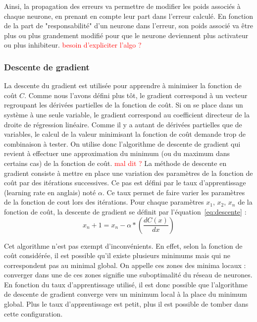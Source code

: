 Ainsi, la propagation des erreurs va permettre de modifier les poids associés à chaque neurone, en prenant en compte leur part dans l'erreur calculé. En fonction de la part de "responsabilité" d'un neurone dans l'erreur, son poids associé va être plus ou plus grandement modifié pour que le neurone deviennent plus activateur ou plus inhibiteur.
\textcolor{red}{besoin d'expliciter l'algo ?}

\subsubsection{Descente de gradient}
La descente du gradient est utilisée pour apprendre à minimiser la fonction de coût $C$. Comme nous l'avons défini plus tôt, le gradient correspond à un vecteur regroupant les dérivées partielles de la fonction de coût. Si on se place dans un système à une seule variable, le gradient correspond au coefficient directeur de la droite de régression linéaire. Comme il y a autant de dérivées partielles que de variables, le calcul de la valeur minimisant la fonction de coût demande trop de combinaison à tester. On utilise donc l'algorithme de descente de gradient qui revient à effectuer une approximation du minimum (ou du maximum dans certains cas) de la fonction de coût. \textcolor{red}{mal dit ?}
La méthode de descente en gradient consiste à mettre en place une variation des paramètres de la fonction de coût par des itérations successives. Ce pas est défini par le taux d'apprentissage (learning rate en anglais) noté $\alpha$. Ce taux permet de faire varier les paramètres de la fonction de cout lors des itérations. Pour chaque paramètres $x_1$, $x_2$, $x_n$ de la fonction de coût, la descente de gradient se définit par l'équation~\ref{eq:descente} :
\begin{equation}
  x_n+1 = x_n - \alpha*(\dfrac{dC(x)}{dx})
\end{equation}

Cet algorithme n'est pas exempt d'inconvénients. En effet, selon la fonction de coût considérée, il est possible qu'il existe plusieurs minimums mais qui ne correspondent pas au minimal global. On appelle ces zones des minima locaux : converger dans une de ces zones signifie une suboptimalité du réseau de neurones. En fonction du taux d'apprentissage utilisé, il est donc possible que l'algorithme de descente de gradient converge vers un minimum local à la place du minimum global. Plus le taux d'apprentissage est petit, plus il est possible de tomber dans cette configuration.

